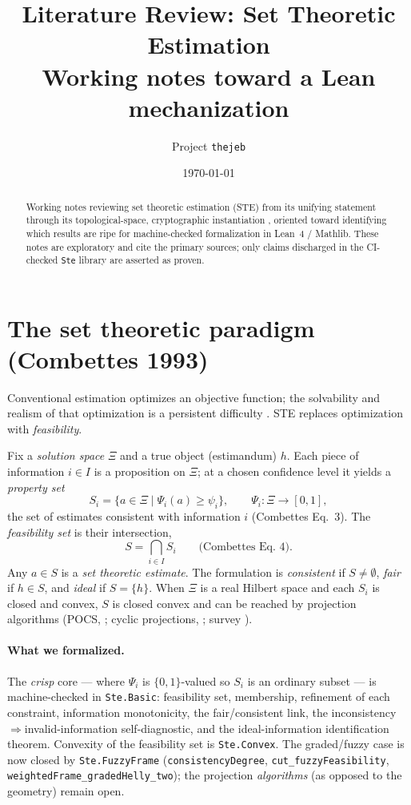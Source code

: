 \documentclass[11pt]{article}
\title{Literature Review: Set Theoretic Estimation\\
\large Working notes toward a Lean mechanization}
\author{Project \texttt{thejeb}}
\date{\today}
\begin{document}
\maketitle

\begin{abstract}
Working notes reviewing set theoretic estimation (STE) from its unifying
statement \citep{combettes1993} through its topological-space,
cryptographic instantiation \citep{carlson2012}, oriented toward
identifying which results are ripe for machine-checked formalization in
Lean~4 / Mathlib. These notes are exploratory and cite the primary
sources; only claims discharged in the CI-checked \texttt{Ste} library
are asserted as proven.
\end{abstract}

\section{The set theoretic paradigm (Combettes 1993)}

Conventional estimation optimizes an objective function; the solvability
and realism of that optimization is a persistent difficulty
\citep{combettes1993}. STE replaces optimization with \emph{feasibility}.

Fix a \emph{solution space} $\Xi$ and a true object (estimandum) $h$.
Each piece of information $i\in I$ is a proposition on $\Xi$; at a chosen
confidence level it yields a \emph{property set}
\begin{equation}
  S_i = \{a\in\Xi \mid \Psi_i(a)\ge\psi_i\},
  \qquad \Psi_i:\Xi\to[0,1],
\end{equation}
the set of estimates consistent with information $i$ (Combettes Eq.~3).
The \emph{feasibility set} is their intersection,
\begin{equation}
  S = \bigcap_{i\in I} S_i \qquad\text{(Combettes Eq.~4).}
\end{equation}
Any $a\in S$ is a \emph{set theoretic estimate}. The formulation is
\emph{consistent} if $S\ne\emptyset$, \emph{fair} if $h\in S$, and
\emph{ideal} if $S=\{h\}$. When $\Xi$ is a real Hilbert space and each
$S_i$ is closed and convex, $S$ is closed convex and can be reached by
projection algorithms (POCS, \citealp{youla1982}; cyclic projections,
\citealp{bregman1967}; survey \citealp{bauschke1996}).

\paragraph{What we formalized.} The \emph{crisp} core --- where $\Psi_i$
is $\{0,1\}$-valued so $S_i$ is an ordinary subset --- is machine-checked
in \texttt{Ste.Basic}: feasibility set, membership, refinement of each
constraint, information monotonicity, the fair/consistent link, the
inconsistency$\Rightarrow$invalid-information self-diagnostic, and the
ideal-information identification theorem. Convexity of the feasibility
set is \texttt{Ste.Convex}. The graded/fuzzy case is now closed by
\texttt{Ste.FuzzyFrame} (\texttt{consistencyDegree},
\texttt{cut\_fuzzyFeasibility}, \texttt{weightedFrame\_gradedHelly\_two});
the projection \emph{algorithms} (as opposed to the geometry) remain
open.
\end{document}
